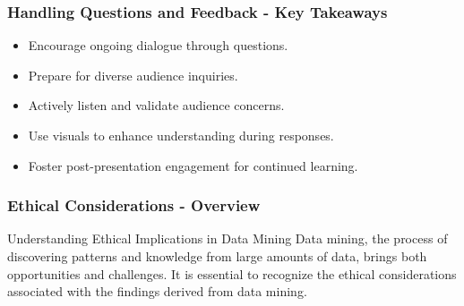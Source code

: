 \documentclass{beamer}
\begin{document}
\begin{frame}[fragile]
    \frametitle{Handling Questions and Feedback - Key Takeaways}
    \begin{itemize}
        \item Encourage ongoing dialogue through questions.
        \item Prepare for diverse audience inquiries.
        \item Actively listen and validate audience concerns.
        \item Use visuals to enhance understanding during responses.
        \item Foster post-presentation engagement for continued learning.
    \end{itemize}
\end{frame}

\begin{frame}[fragile]
    \frametitle{Ethical Considerations - Overview}
    \begin{block}{Understanding Ethical Implications in Data Mining}
        Data mining, the process of discovering patterns and knowledge from large amounts of data, brings both opportunities and challenges. 
        It is essential to recognize the ethical considerations associated with the findings derived from data mining.
    \end{block}
\end{frame}
\end{document}
